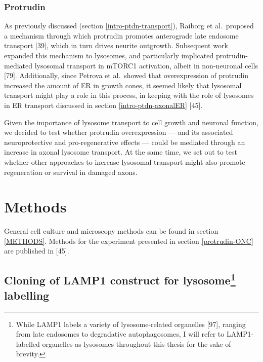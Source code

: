 \documentclass[
  12pt,
  a4paper,
]{book}
\begin{document}
\hypertarget{protrudin}{%
\subsubsection{Protrudin}\label{protrudin}}

As previously discussed (section \ref{intro-ptdn-transport}), Raiborg et al.~proposed a mechanism through which protrudin promotes anterograde late endosome transport {[}39{]}, which in turn drives neurite outgrowth. Subsequent work expanded this mechanism to lysosomes, and particularly implicated protrudin-mediated lysosomal transport in mTORC1 activation, albeit in non-neuronal cells {[}79{]}. Additionally, since Petrova et al.~showed that overexpression of protrudin increased the amount of ER in growth cones, it seemed likely that lysosomal transport might play a role in this process, in keeping with the role of lysosomes in ER transport discussed in section \ref{intro-ptdn-axonalER} {[}45{]}.

Given the importance of lysosome transport to cell growth and neuronal function, we decided to test whether protrudin overexpression --- and its associated neuroprotective and pro-regenerative effects --- could be mediated through an increase in axonal lysosome transport. At the same time, we set out to test whether other approaches to increase lysosomal transport might also promote regeneration or survival in damaged axons.

\hypertarget{methods}{%
\section{Methods}\label{methods}}

General cell culture and microscopy methods can be found in section \ref{METHODS}. Methods for the experiment presented in section \ref{protrudin-ONC} are published in {[}45{]}.

\hypertarget{cloning}{%
\subsection[Cloning of LAMP1 construct for lysosome labelling]{\texorpdfstring{Cloning of LAMP1 construct for lysosome\footnote{While LAMP1 labels a variety of lysosome-related organelles {[}97{]}, ranging from late endosomes to degradative autophagosomes, I will refer to LAMP1-labelled organelles as lysosomes throughout this thesis for the sake of brevity.} labelling}{Cloning of LAMP1 construct for lysosome labelling}}\label{cloning}}
\end{document}
